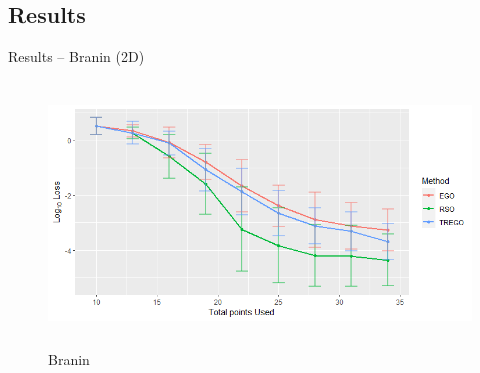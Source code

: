 \documentclass{beamer}
\begin{document}
\subsection{Results}


\begin{frame}{Results -- Branin (2D)}
\begin{figure}
\centering
\includegraphics[height=7cm]{../chapters/RSO/pdfs/branin_error.png}
\small {Branin}
\end{figure}
\end{frame}
\end{document}
